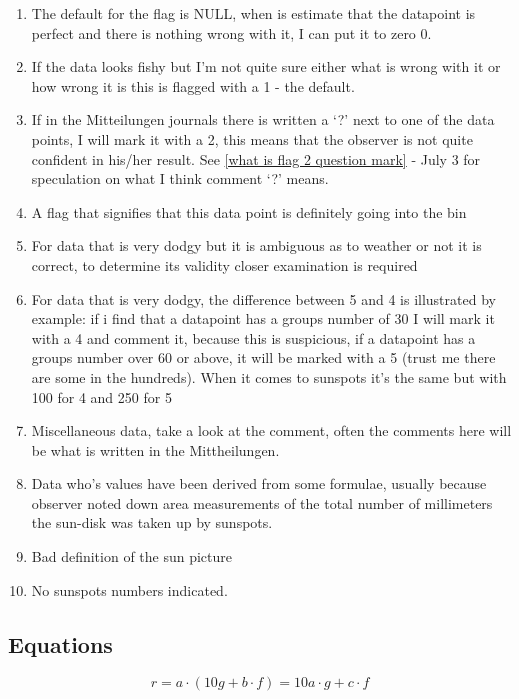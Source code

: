 \documentclass[12pt]{article}
\begin{document}
\begin{enumerate}[start=0]
    \item The default for the flag is NULL, when is estimate that the datapoint is perfect and there is nothing wrong with it, I can put it to zero 0.
    \item If the data looks fishy but I'm not quite sure either what is wrong with it or how wrong it is this is flagged with a 1 - the default.
    \item If in the Mitteilungen journals there is written a `?' next to one of the data points, I will mark it with a 2, this means that the observer is not quite confident in his/her result. See \ref{what is flag 2 question mark} - July 3 for speculation on what I think comment `?' means.
    \item A flag that signifies that this data point is definitely going into the bin
    \item For data that is very dodgy but it is ambiguous as to weather or not it is correct, to determine its validity closer examination is required
    \item For data that is very dodgy, the difference between 5 and 4 is illustrated by example: if i find that a datapoint has a groups number of 30 I will mark it with a 4 and comment it, because this is suspicious, if a datapoint has a groups number over 60 or above, it will be marked with a 5 (trust me there are some in the hundreds). When it comes to sunspots it's the same but with 100 for 4 and 250 for 5
    \item Miscellaneous data, take a look at the comment, often the comments here will be what is written in the Mittheilungen.
    \item Data who's values have been derived from some formulae, usually because observer noted down area measurements of the total number of millimeters the sun-disk was taken up by sunspots.
    \item Bad definition of the sun picture
    \item No sunspots numbers indicated.
\end{enumerate}


\subsection{Equations}

\begin{equation}\label{derivde equation}
    r = a\cdot(10 g + b\cdot f) = 10 a\cdot g + c\cdot f
\end{equation}
\end{document}
